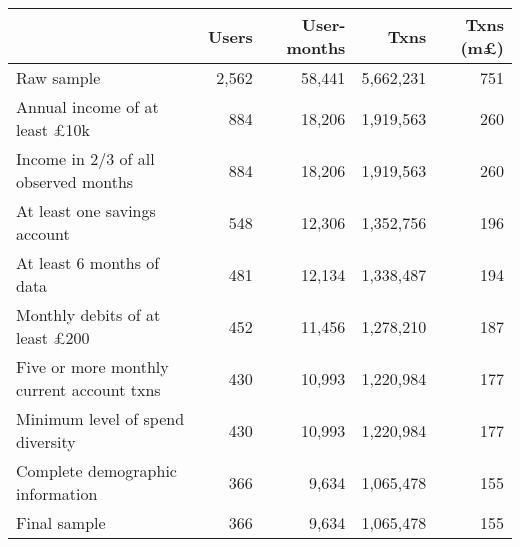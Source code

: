\begin{tabular}{lrrrr}
\toprule
                                          & Users & User-months &      Txns & Txns (m\pounds) \\
\midrule
                               Raw sample & 2,562 &      58,441 & 5,662,231 &             751 \\
     Annual income of at least \pounds10k &   884 &      18,206 & 1,919,563 &             260 \\
     Income in 2/3 of all observed months &   884 &      18,206 & 1,919,563 &             260 \\
             At least one savings account &   548 &      12,306 & 1,352,756 &             196 \\
                At least 6 months of data &   481 &      12,134 & 1,338,487 &             194 \\
    Monthly debits of at least \pounds200 &   452 &      11,456 & 1,278,210 &             187 \\
Five or more monthly current account txns &   430 &      10,993 & 1,220,984 &             177 \\
         Minimum level of spend diversity &   430 &      10,993 & 1,220,984 &             177 \\
         Complete demographic information &   366 &       9,634 & 1,065,478 &             155 \\
                             Final sample &   366 &       9,634 & 1,065,478 &             155 \\
\bottomrule
\end{tabular}
